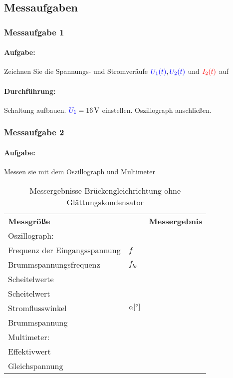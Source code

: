 \documentclass[11pt,a4paper,titlepage,parskip=half]{scrreprt}
\begin{document}
			\subsection{Messaufgaben}
			\subsubsection{Messaufgabe 1}
			\paragraph{Aufgabe:} Zeichnen Sie die Spannungs- und Stromveräufe $\textcolor{blue}{U_1(t)}, \textcolor{blue}{U_2(t)}$ und $\textcolor{red}{I_2(t)}$ auf
			\paragraph{Durchführung:}  Schaltung aufbauen. $\textcolor{blue}{U_1} = \SI{16}{\volt}$  einstellen. Oszillograph anschließen.\\
			
			
			\subsubsection{Messaufgabe 2}
			\paragraph{Aufgabe:} Messen sie mit dem Oszillograph und Multimeter
			\begin{table}[H]
				\caption{Messergebnisse Brückengleichrichtung ohne Glättungskondensator}
				\label{tbl:messergebnisse2.1}
				\renewcommand{\arraystretch}{1.6}
                \begin{center}
				\begin{tabular}{ll|l}
					\multicolumn{2}{l}{\textbf{Messgröße}} & \textbf{Messergebnis}\\
                                                \multicolumn{3}{l}{Oszillograph:}\\\hline
					Frequenz der Eingangsspannung & $f$ & \\\hline
					Brummspannungsfrequenz & $f_{br}$ & \\\hline
					Scheitelwerte & \spannung{$U_{1_{max}}$} & \\\hline
					Scheitelwert & \spannung{$U_{2_{max}}$} &\\\hline
					Stromflusswinkel &  $\alpha [ \degree]$& \\\hline
					Brummspannung &  \spannung{$U_{brmax}$} &\\\hline
                                                \multicolumn{3}{l}{Multimeter:}\\\hline
					Effektivwert & \spannung{$U_{1}$} &\\\hline
					Gleichspannung & \spannung{$U_{2-}$} & \\
				\end{tabular}
            \end{center}
			\end{table}
        
\end{document}
